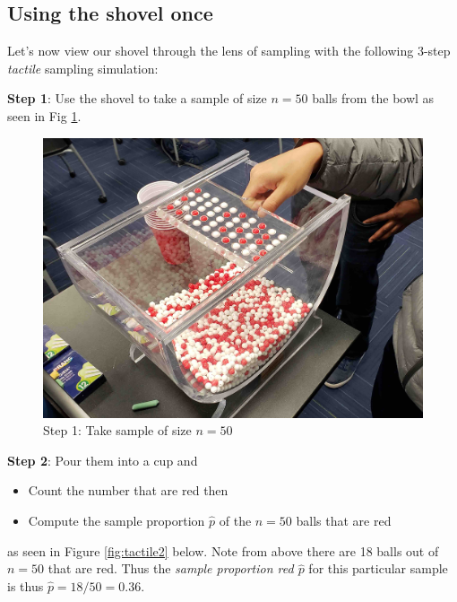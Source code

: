 \documentclass[12pt,]{krantz}
\providecommand{\tightlist}{%
  \setlength{\itemsep}{0pt}\setlength{\parskip}{0pt}}
\begin{document}
\subsection{Using the shovel once}\label{using-the-shovel-once}

Let's now view our shovel through the lens of sampling with the
following 3-step \emph{tactile} sampling simulation:

\textbf{Step 1}: Use the shovel to take a sample of size \(n=50\) balls
from the bowl as seen in Fig \ref{fig:tactile1}.

\begin{figure}

{\centering \includegraphics[width=0.8\linewidth]{images/sampling/tactile_1_b} 

}

\caption{Step 1: Take sample of size $n=50$}\label{fig:tactile1}
\end{figure}

\textbf{Step 2}: Pour them into a cup and

\begin{itemize}
\tightlist
\item
  Count the number that are red then
\item
  Compute the sample proportion \(\widehat{p}\) of the \(n=50\) balls
  that are red
\end{itemize}

as seen in Figure \ref{fig:tactile2} below. Note from above there are 18
balls out of \(n=50\) that are red. Thus the \emph{sample proportion red
\(\widehat{p}\)} for this particular sample is thus
\(\widehat{p} = 18 / 50 = 0.36\).
\end{document}
